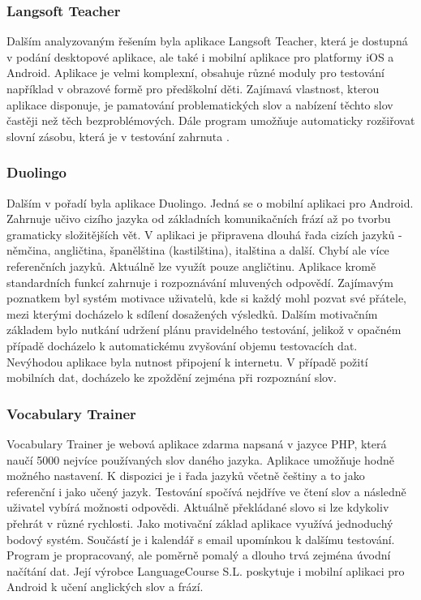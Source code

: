 \documentclass[a4paper,11pt,titlepage,fleqn]{article}
\begin{document}
        \subsubsection{Langsoft Teacher}
            Dalším analyzovaným řešením byla aplikace Langsoft Teacher, která je dostupná v podání desktopové aplikace, ale také i mobilní aplikace pro platformy iOS a Android. Aplikace je velmi komplexní, obsahuje různé moduly pro testování například v obrazové formě pro předškolní děti. Zajímavá vlastnost, kterou aplikace disponuje, je pamatování problematických slov a nabízení těchto slov častěji než těch bezproblémových. Dále program umožňuje automaticky rozšiřovat slovní zásobu, která je v testování zahrnuta \cite{bib:langsoft}.

        \subsubsection{Duolingo}
            Dalším v pořadí byla aplikace Duolingo. Jedná se o mobilní aplikaci pro Android. Zahrnuje učivo cizího jazyka od základních komunikačních frází až po tvorbu gramaticky složitějších vět. V aplikaci je připravena dlouhá řada cizích jazyků - němčina, angličtina, španělština (kastilština), italština a další. Chybí ale více referenčních jazyků. Aktuálně lze využít pouze angličtinu. Aplikace kromě standardních funkcí zahrnuje i rozpoznávání mluvených odpovědí. Zajímavým poznatkem byl systém motivace uživatelů, kde si každý mohl pozvat své přátele, mezi kterými docházelo k sdílení dosažených výsledků. Dalším motivačním základem bylo nutkání udržení plánu pravidelného testování, jelikož v opačném případě docházelo k automatickému zvyšování objemu testovacích dat. Nevýhodou aplikace byla nutnost připojení k internetu. V případě požití mobilních dat, docházelo ke zpoždění zejména při rozpoznání slov.

        \subsubsection{Vocabulary Trainer}
            Vocabulary Trainer je webová aplikace zdarma napsaná v jazyce PHP, která naučí 5000 nejvíce používaných slov daného jazyka. Aplikace umožňuje hodně možného nastavení. K dispozici je i řada jazyků včetně češtiny a to jako referenční i jako učený jazyk. Testování spočívá nejdříve ve čtení slov a následně uživatel vybírá možnosti odpovědi. Aktuálně překládané slovo si lze kdykoliv přehrát v různé rychlosti. Jako motivační základ aplikace využívá jednoduchý bodový systém. Součástí je i kalendář s email upomínkou k dalšímu testování. Program je propracovaný, ale poměrně pomalý a dlouho trvá zejména úvodní načítání dat. Její výrobce LanguageCourse S.L. poskytuje i mobilní aplikaci pro Android k učení anglických slov a frází.
\end{document}
